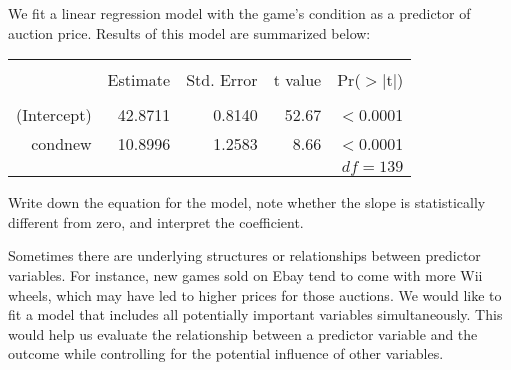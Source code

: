 \begin{exercisewrap}
\begin{nexercise}
\label{condNewVarForMarioKartOnly}
We fit a linear regression model with
the game's condition as a predictor of auction price.
Results of this model are summarized below:
\begin{center}
\begin{tabular}{rrrrr}
  \hline
  \vspace{-3.7mm} & & & & \\
 & Estimate & Std. Error & t value & Pr($>$$|$t$|$) \\ 
  \hline
  \vspace{-3.8mm} & & & & \\
(Intercept) & 42.8711 & 0.8140 & 52.67 & $<$0.0001 \\ 
  cond\us{}new & 10.8996 & 1.2583 & 8.66 & $<$0.0001 \\ 
   \hline
   &&&\multicolumn{2}{r}{$df=139$}
\end{tabular}
\end{center}
Write down the equation for the model,
note whether the slope is statistically different from zero,
and interpret the coefficient.\footnotemark{}
\end{nexercise}
\end{exercisewrap}

Sometimes there are underlying structures or relationships between predictor variables. For instance, new games sold on Ebay tend to come with more Wii wheels, which may have led to higher prices for those auctions. We would like to fit a model that includes all potentially important variables simultaneously. This would help us evaluate the relationship between a predictor variable and the outcome while controlling for the potential influence of other variables.

